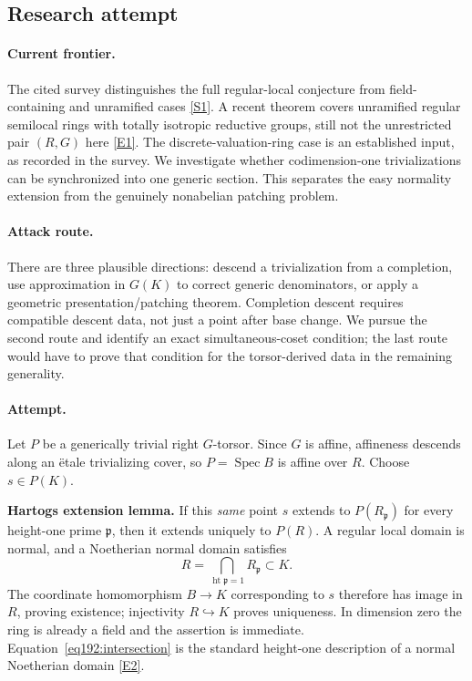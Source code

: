 \documentclass[11pt,a4paper]{article}
\newcommand{\sref}[2]{\hyperlink{source:#1:#2}{[S#2]}}
\newcommand{\eref}[2]{\hyperlink{extra:#1:#2}{[E#2]}}
\numberwithin{equation}{section}
\begin{document}
\subsection{Research attempt}

\paragraph{Current frontier.}
The cited survey distinguishes the full regular-local conjecture from field-containing and unramified cases \sref{192}{1}. A recent theorem covers unramified regular semilocal rings with totally isotropic reductive groups, still not the unrestricted pair $(R,G)$ here \eref{192}{1}. The discrete-valuation-ring case is an established input, as recorded in the survey. We investigate whether codimension-one trivializations can be synchronized into one generic section. This separates the easy normality extension from the genuinely nonabelian patching problem.

\paragraph{Attack route.}
There are three plausible directions: descend a trivialization from a completion, use approximation in $G(K)$ to correct generic denominators, or apply a geometric presentation/patching theorem. Completion descent requires compatible descent data, not just a point after base change. We pursue the second route and identify an exact simultaneous-coset condition; the last route would have to prove that condition for the torsor-derived data in the remaining generality.

\paragraph{Attempt.}
Let $P$ be a generically trivial right $G$-torsor. Since $G$ is affine, affineness descends along an \"etale trivializing cover, so $P=\operatorname{Spec}B$ is affine over $R$. Choose $s\in P(K)$.

\textbf{Hartogs extension lemma.} If this \emph{same} point $s$ extends to $P(R_{\mathfrak p})$ for every height-one prime $\mathfrak p$, then it extends uniquely to $P(R)$.
A regular local domain is normal, and a Noetherian normal domain satisfies
\begin{equation}\label{eq192:intersection}
 R=\bigcap_{\operatorname{ht}\mathfrak p=1}R_{\mathfrak p}\subset K.
\end{equation}
The coordinate homomorphism $B\to K$ corresponding to $s$ therefore has image in $R$, proving existence; injectivity $R\hookrightarrow K$ proves uniqueness. In dimension zero the ring is already a field and the assertion is immediate. Equation~\eqref{eq192:intersection} is the standard height-one description of a normal Noetherian domain \eref{192}{2}.
\end{document}
